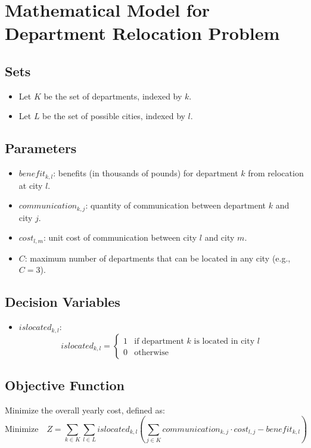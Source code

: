 \documentclass{article}
\begin{document}
\section*{Mathematical Model for Department Relocation Problem}

\subsection*{Sets}
\begin{itemize}
    \item Let \( K \) be the set of departments, indexed by \( k \).
    \item Let \( L \) be the set of possible cities, indexed by \( l \).
\end{itemize}

\subsection*{Parameters}
\begin{itemize}
    \item \( benefit_{k, l} \): benefits (in thousands of pounds) for department \( k \) from relocation at city \( l \).
    \item \( communication_{k, j} \): quantity of communication between department \( k \) and city \( j \).
    \item \( cost_{l, m} \): unit cost of communication between city \( l \) and city \( m \).
    \item \( C \): maximum number of departments that can be located in any city (e.g., \( C = 3 \)).
\end{itemize}

\subsection*{Decision Variables}
\begin{itemize}
    \item \( islocated_{k, l} \): 
    \[
    islocated_{k, l} = 
    \begin{cases} 
    1 & \text{if department } k \text{ is located in city } l \\
    0 & \text{otherwise}
    \end{cases}
    \]
\end{itemize}

\subsection*{Objective Function}
Minimize the overall yearly cost, defined as:
\[
\text{Minimize} \quad Z = \sum_{k \in K} \sum_{l \in L} islocated_{k, l} \left( \sum_{j \in K} communication_{k, j} \cdot cost_{l, j} - benefit_{k, l} \right)
\]
\end{document}
